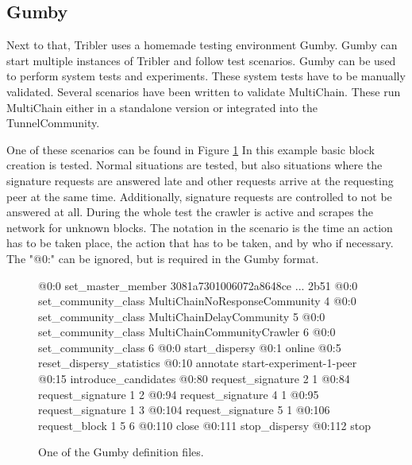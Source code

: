 \subsection{Gumby}

Next to that, Tribler uses a homemade testing environment Gumby.
Gumby can start multiple instances of Tribler and follow test scenarios.
Gumby can be used to perform system tests and experiments.
These system tests have to be manually validated.
Several scenarios have been written to validate MultiChain.
These run MultiChain either in a standalone version or integrated into the TunnelCommunity.

One of these scenarios can be found in Figure \ref{fig:exp-gumby-scenario}
In this example basic block creation is tested.
Normal situations are tested,
but also situations where the signature requests are answered late
and other requests arrive at the requesting peer at the same time.
Additionally, signature requests are controlled to not be answered at all.
During the whole test the crawler is active and scrapes the network for unknown blocks.
The notation in the scenario is the time an action has to be taken place,
the action that has to be taken, and by who if necessary.
The "@0:" can be ignored, but is required in the Gumby format.

\begin{figure}
\begin{FVerbatim}[fontsize=\small]
@0:0 set_master_member 3081a7301006072a8648ce ... 2b51
@0:0 set_community_class MultiChainNoResponseCommunity {4}
@0:0 set_community_class MultiChainDelayCommunity {5}
@0:0 set_community_class MultiChainCommunityCrawler {6}
@0:0 set_community_class {6}
@0:0 start_dispersy
@0:1 online
@0:5 reset_dispersy_statistics
@0:10 annotate start-experiment-1-peer
@0:15 introduce_candidates
@0:80 request_signature 2 {1}
@0:84 request_signature 1 {2}
@0:94 request_signature 4 {1}
@0:95 request_signature 1 {3}
@0:104 request_signature 5 {1}
@0:106 request_block 1 5 {6}
@0:110 close
@0:111 stop_dispersy
@0:112 stop
\end{FVerbatim}
    \caption{One of the Gumby definition files.}
    \label{fig:exp-gumby-scenario}
\end{figure}